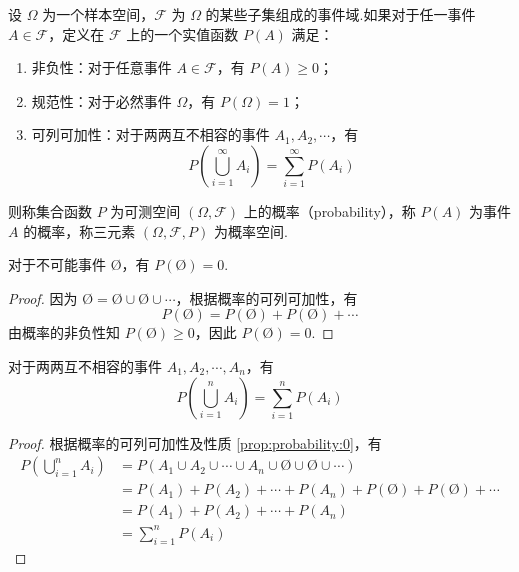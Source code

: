 \begin{definition}
    \indent 设 $\varOmega$ 为一个样本空间，$\mathcal{F}$ 为 $\varOmega$ 的某些子集组成的事件域.如果对于任一事件 $A \in \mathcal{F}$，定义在 $\mathcal{F}$ 上的一个实值函数 $P(A)$ 满足：
    \begin{enumerate}
        \item 非负性：对于任意事件 $A \in \mathcal{F}$，有 $P(A) \geqslant 0$；
        \item 规范性：对于必然事件 $\varOmega$，有 $P(\varOmega)=1$；
        \item 可列可加性：对于两两互不相容的事件 $A_1,A_2,\cdots$，有
        $$
        P \left(\bigcup_{i=1}^\infty A_i \right) = \sum_{i=1}^\infty P(A_i)
        $$
    \end{enumerate}
    则称集合函数 $P$ 为可测空间 $(\varOmega, \mathcal{F})$ 上的{\heiti 概率}（probability），称 $P(A)$ 为事件 $A$ 的{\heiti 概率}，称三元素 $(\varOmega, \mathcal{F}, P)$ 为{\heiti 概率空间}.
\end{definition}

\begin{property}
    \indent 对于不可能事件 $\text{\O}$，有 $P(\text{\O})=0$.
\end{property}

\begin{proof}
    因为 $\text{\O} = \text{\O} \cup \text{\O} \cup \cdots$，根据概率的可列可加性，有
    $$
    P(\text{\O}) = P(\text{\O}) + P(\text{\O}) + \cdots
    $$
    由概率的非负性知 $P(\text{\O}) \geqslant 0$，因此 $P(\text{\O})=0$.
\end{proof}

\begin{property}
    \indent 对于两两互不相容的事件 $A_1,A_2,\cdots,A_n$，有
    \begin{equation}
        P \left(\bigcup_{i=1}^n A_i \right) = \sum_{i=1}^n P(A_i)
    \end{equation}
\end{property}

\begin{proof}
    根据概率的可列可加性及性质 \ref{prop:probability:0}，有
    $$
    \begin{aligned}
        P \left(\bigcup_{i=1}^n A_i \right) &= P(A_1 \cup A_2 \cup \cdots \cup A_n \cup \text{\O} \cup \text{\O} \cup \cdots) \\
        &= P(A_1) + P(A_2) + \cdots + P(A_n) + P(\text{\O}) + P(\text{\O}) + \cdots \\
        &= P(A_1) + P(A_2) + \cdots + P(A_n) \\
        &= \sum_{i=1}^n P(A_i)
    \end{aligned}
    $$
\end{proof}

